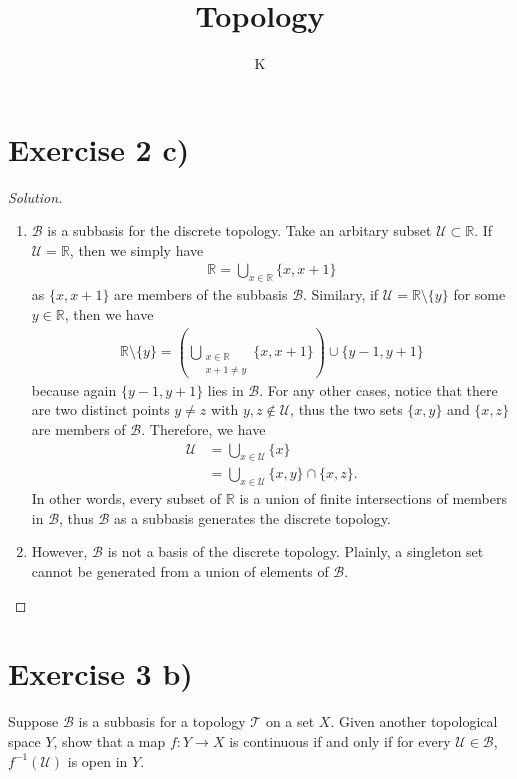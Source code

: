 \documentclass[a4paper]{article}
\title{Topology}
\author{K}
\begin{document}
\section*{Exercise 2 c)}

\begin{proof}[Solution]
    \begin{enumerate}
        \item \(\mathcal{B}\) is a subbasis for the discrete topology. Take an arbitary subset \(\mathcal{U} \subset \mathbb{R}\). If \(\mathcal{U} = \mathbb{R}\), then we simply have
        \begin{align*}
            \mathbb{R} = \bigcup_{x \in \mathbb{R}} \{x, x + 1\}
        \end{align*}
        as \(\{x, x + 1\}\) are members of the subbasis \(\mathcal{B}\). Similary, if \(\mathcal{U} = \mathbb{R} \setminus \{y\}\) for some \(y \in \mathbb{R}\), then we have
        \begin{align*}
            \mathbb{R} \setminus \{y\} = \left( \bigcup_{\substack{x \in \mathbb{R} \\ x + 1 \neq y}} \{x, x + 1\} \right) \cup \{y - 1, y + 1\}
        \end{align*}
        because again \(\{y - 1, y + 1\}\) lies in \(\mathcal{B}\). For any other cases, notice that there are two distinct points \(y \neq z\) with \(y, z \not\in \mathcal{U}\), thus the two sets \(\{x, y\}\) and \(\{x, z\}\) are members of \(\mathcal{B}\). Therefore, we have
        \begin{align*}
            \mathcal{U} &= \bigcup_{x \in \mathcal{U}} \{x\} \\
            &= \bigcup_{x \in \mathcal{U}} \{x, y\} \cap \{x, z\} \text{.}
        \end{align*}
        In other words, every subset of \(\mathbb{R}\) is a union of finite intersections of members in \(\mathcal{B}\), thus \(\mathcal{B}\) as a subbasis generates the discrete topology.
        \item However, \(\mathcal{B}\) is not a basis of the discrete topology. Plainly, a singleton set cannot be generated from a union of elements of \(\mathcal{B}\).
    \end{enumerate}
\end{proof}

\section*{Exercise 3 b)}
Suppose \(\mathcal{B}\) is a subbasis for a topology \(\mathcal{T}\) on a set \(X\). Given another topological space \(Y\), show that a map \(f: Y \longrightarrow X\) is continuous if and only if for every \(\mathcal{U} \in \mathcal{B}\), \(f^{-1}(\mathcal{U})\) is open in \(Y\).
\end{document}
